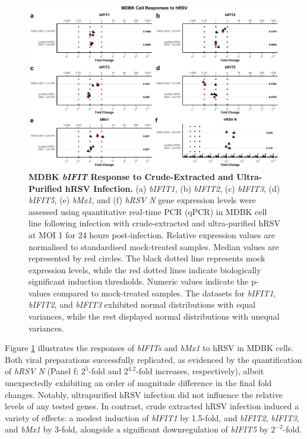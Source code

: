 \begin{figure}
    \centering
    \includegraphics[width=1\linewidth]{07. Chapter 2/Figs/02. Induction/07. mdbk_hrsv.pdf}
    \caption[MDBK \textit{bIFIT} Response to Crude-Extracted and Ultra-Purified hRSV Infection.]{\textbf{MDBK \textit{bIFIT} Response to Crude-Extracted and Ultra-Purified hRSV Infection.} (a) \textit{bIFIT1}, (b) \textit{bIFIT2}, (c) \textit{bIFIT3}, (d) \textit{bIFIT5}, (e) \textit{bMx1}, and (f) \textit{hRSV N} gene expression levels were assessed using quantitative real-time PCR (qPCR) in MDBK cell line following infection with crude-extracted and ultra-purified hRSV at MOI 1 for 24 hours post-infection. Relative expression values are normalised to standardised mock-treated samples. Median values are represented by red circles. The black dotted line represents mock expression levels, while the red dotted lines indicate biologically significant induction thresholds. Numeric values indicate the p-values compared to mock-treated samples. The datasets for \textit{bIFIT1}, \textit{bIFIT2}, and \textit{bIFIT3} exhibited normal distributions with equal variances, while the rest displayed normal distributions with unequal variances.}
    \label{fig:bIFIT responses to hRSV infection in MDBK}
\end{figure}

Figure \ref{fig:bIFIT responses to hRSV infection in MDBK} illustrates the responses of \textit{bIFITs} and \textit{bMx1} to hRSV in MDBK cells. Both viral preparations successfully replicated, as evidenced by the quantification of \textit{hRSV N} (Panel f; \(2^{5}\)-fold and \(2^{4.2}\)-fold increases, respectively), albeit unexpectedly exhibiting an order of magnitude difference in the final fold changes. Notably, ultrapurified hRSV infection did not influence the relative levels of any tested genes. In contrast, crude extracted hRSV infection induced a variety of effects: a modest induction of \textit{bIFIT1} by 1.5-fold, and \textit{bIFIT2}, \textit{bIFIT3}, and \textit{bMx1} by 3-fold, alongside a significant downregulation of \textit{bIFIT5} by \(2^{-2}\)-fold.


